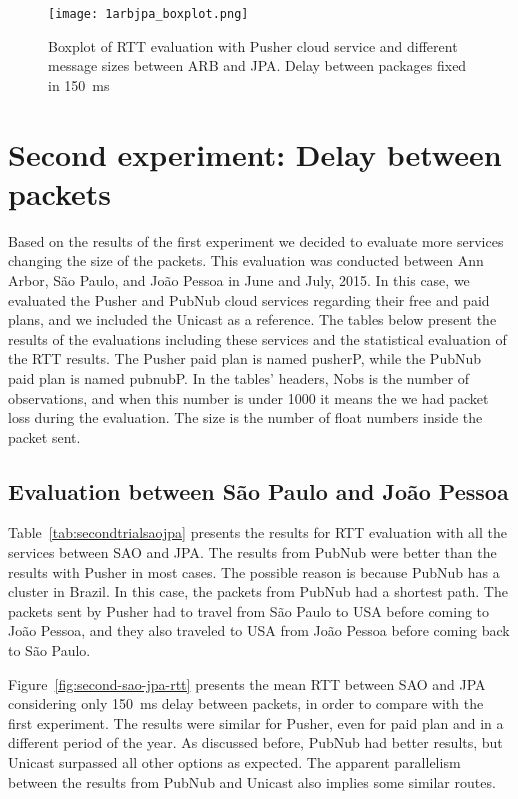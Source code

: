 \begin{figure}[!ht]
	\centering
	\texttt{[image: 1arbjpa\_boxplot.png]}
	\caption{Boxplot of RTT evaluation with Pusher cloud service and different message sizes between ARB and JPA. Delay between packages fixed in 150~ms}
	\label{fig:arb-jpa-boxplot}
\end{figure}


\section{Second experiment: Delay between packets}
\label{sec:secondtrial}

Based on the results of the first experiment we decided to evaluate more services changing the size of the packets.
This evaluation was conducted between Ann Arbor, São Paulo, and João Pessoa in June and July, 2015.
In this case, we evaluated the Pusher and PubNub cloud services regarding their free and paid plans, and we included the Unicast as a reference.
The tables below present the results of the evaluations including these services and the statistical evaluation of the RTT results.
The Pusher paid plan is named pusherP, while the PubNub paid plan is named pubnubP.
In the tables' headers, Nobs is the number of observations, and when this number is under 1000 it means the we had packet loss during the evaluation.
The size is the number of float numbers inside the packet sent.

\subsection*{Evaluation between São Paulo and João Pessoa} 

Table~\ref{tab:secondtrialsaojpa} presents the results for RTT evaluation with all the services between SAO and JPA.
The results from PubNub were better than the results with Pusher in most cases.
The possible reason is because PubNub has a cluster in Brazil.
In this case, the packets from PubNub had a shortest path.
The packets sent by Pusher had to travel from São Paulo to USA before coming to João Pessoa, and they also traveled to USA from João Pessoa before coming back to São Paulo.

Figure~\ref{fig:second-sao-jpa-rtt} presents the mean RTT between SAO and JPA considering only 150~ms delay between packets, in order to compare with the first experiment.
The results were similar for Pusher, even for paid plan and in a different period of the year.
As discussed before, PubNub had better results, but Unicast surpassed all other options as expected.
The apparent parallelism between the results from PubNub and Unicast also implies some similar routes.

